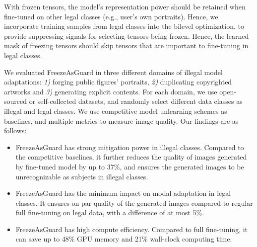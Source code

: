 \documentclass{article}
\begin{document}

With frozen tensors, the model's representation power should be retained when fine-tuned on other legal classes (e.g., user's own portraits). Hence, we  incorporate training samples from legal classes into the bilevel optimization, to provide suppressing signals for selecting tensors being frozen. Hence, the learned mask of freezing tensors should skip tensors that are important to fine-tuning in legal classes. 

We evaluated FreezeAsGuard in three different domains of illegal model adaptations: \emph{1)} forging public figures' portraits, \emph{2)} duplicating copyrighted artworks and \emph{3)} generating explicit contents. For each domain, we use open-sourced or self-collected datasets, and randomly select different data classes as illegal and legal classes. We use competitive model unlearning schemes as baselines, and multiple metrics to measure image quality. Our findings are as follows:
\begin{itemize}
	\item FreezeAsGuard has strong mitigation power in illegal classes. Compared to the competitive baselines, it further reduces the quality of images generated by fine-tuned model by up to 37\%, and ensures the generated images to be unrecognizable as subjects in illegal classes.
	\item FreezeAsGuard has the minimum impact on modal adaptation in legal classes. It ensures on-par quality of the generated images compared to regular full fine-tuning on legal data, with a difference of at most 5\%.
	\item FreezeAsGuard has high compute efficiency. Compared to full fine-tuning, it can save up to 48\% GPU memory and 21\% wall-clock computing time.
\end{itemize}
\end{document}
